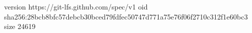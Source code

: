 version https://git-lfs.github.com/spec/v1
oid sha256:28bcb8bfc57debcb30bced79fdfec50747d771a75e76f06f2710c312f1e60bc3
size 24619
